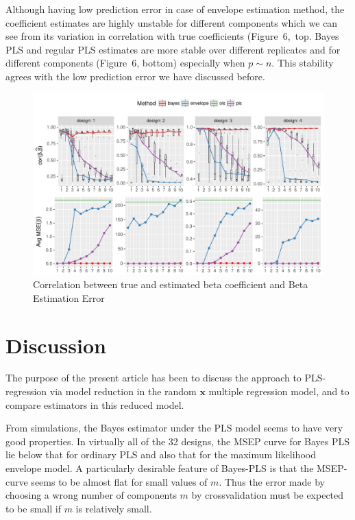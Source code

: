 \documentclass[num-refs]{wiley-article}
\begin{document}
Although having low prediction error in case of envelope estimation method, the coefficient estimates are highly unstable for different components which we can see from its variation in correlation with true coefficients (Figure~6,~top. Bayes PLS and regular PLS estimates are more stable over different replicates and for different components (Figure~6, bottom) especially when $p\sim n$. This stability agrees with the low prediction error we have discussed before.


\begin{figure}[!ht]
  \centering
  \includegraphics[width=\textwidth]{est-combined-plot.pdf}
  \caption{Correlation between true and estimated beta coefficient and Beta Estimation Error}
  \label{fig:est-error-combined}
\end{figure}

\section{Discussion}

The purpose of the present article has been to discuss the approach to PLS-regression via model reduction in the random $\bm{x}$ multiple regression model, and to compare estimators in this reduced model.

From simulations, the Bayes estimator under the PLS model seems to have very good properties. In virtually all of the 32 designs, the MSEP curve for Bayes PLS lie below that for ordinary PLS and also that for the maximum likelihood envelope model. A particularly desirable feature of Bayes-PLS is that the MSEP-curve seems to be almost flat for small values of $m$. Thus the error made by choosing a wrong number of components $m$ by crossvalidation must be expected to be small if $m$ is relatively small.
\end{document}
